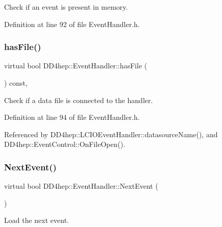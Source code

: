 Check if an event is present in memory. 



Definition at line 92 of file Event\+Handler.\+h.

\hypertarget{class_d_d4hep_1_1_event_handler_a13bdcc68a401f6f2a9b855c4bc4beb11}{}\label{class_d_d4hep_1_1_event_handler_a13bdcc68a401f6f2a9b855c4bc4beb11} 
\subsubsection{\texorpdfstring{has\+File()}{hasFile()}}
{\footnotesize\ttfamily virtual bool D\+D4hep\+::\+Event\+Handler\+::has\+File (\begin{DoxyParamCaption}{ }\end{DoxyParamCaption}) const\hspace{0.3cm}{\ttfamily [inline]}, {\ttfamily [virtual]}}



Check if a data file is connected to the handler. 



Definition at line 94 of file Event\+Handler.\+h.



Referenced by D\+D4hep\+::\+L\+C\+I\+O\+Event\+Handler\+::datasource\+Name(), and D\+D4hep\+::\+Event\+Control\+::\+On\+File\+Open().

\hypertarget{class_d_d4hep_1_1_event_handler_ac2360791d3a44f4cef0987f9a7ec51ce}{}\label{class_d_d4hep_1_1_event_handler_ac2360791d3a44f4cef0987f9a7ec51ce} 
\subsubsection{\texorpdfstring{Next\+Event()}{NextEvent()}}
{\footnotesize\ttfamily virtual bool D\+D4hep\+::\+Event\+Handler\+::\+Next\+Event (\begin{DoxyParamCaption}{ }\end{DoxyParamCaption})\hspace{0.3cm}{\ttfamily [pure virtual]}}



Load the next event. 



